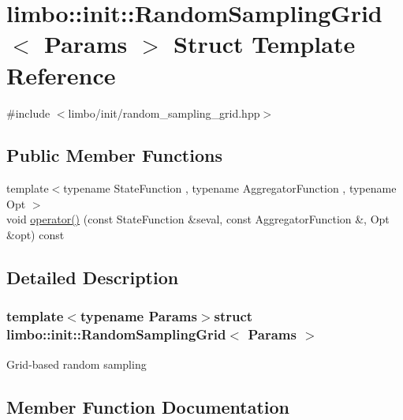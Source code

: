 \hypertarget{structlimbo_1_1init_1_1_random_sampling_grid}{}\section{limbo\+:\+:init\+:\+:Random\+Sampling\+Grid$<$ Params $>$ Struct Template Reference}
\label{structlimbo_1_1init_1_1_random_sampling_grid}


{\ttfamily \#include $<$limbo/init/random\+\_\+sampling\+\_\+grid.\+hpp$>$}

\subsection*{Public Member Functions}
\begin{DoxyCompactItemize}
\item 
{\footnotesize template$<$typename State\+Function , typename Aggregator\+Function , typename Opt $>$ }\\void \hyperlink{structlimbo_1_1init_1_1_random_sampling_grid_a6fd277031f69bf9da891b5f35065c369}{operator()} (const State\+Function \&seval, const Aggregator\+Function \&, Opt \&opt) const 
\end{DoxyCompactItemize}


\subsection{Detailed Description}
\subsubsection*{template$<$typename Params$>$struct limbo\+::init\+::\+Random\+Sampling\+Grid$<$ Params $>$}

Grid-\/based random sampling 

\subsection{Member Function Documentation}
\hypertarget{structlimbo_1_1init_1_1_random_sampling_grid_a6fd277031f69bf9da891b5f35065c369}{}
